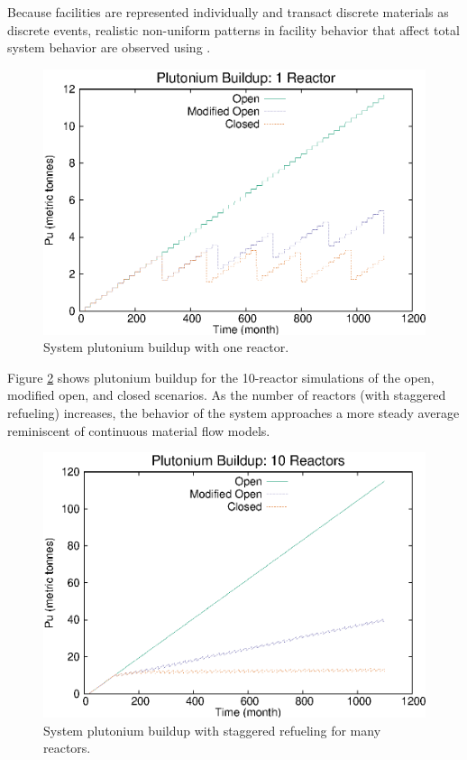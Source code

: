 Because facilities are represented individually and transact discrete
materials as discrete events, realistic non-uniform patterns in facility
behavior that affect total system behavior are observed using \Cyclus.

\begin{figure}[H]
\begin{center}
\includegraphics{./images/puseries-1.eps}
\end{center}
\caption{System plutonium buildup with one reactor.}
\label{fig:puseries1}
\end{figure}

Figure \ref{fig:puseriesn} shows plutonium buildup for the 10-reactor
simulations of the open, modified open, and closed scenarios.  As the number
of reactors (with staggered refueling) increases, the behavior of the system
approaches a more steady average reminiscent of continuous material flow
models.

\begin{figure}[H]
\begin{center}
\includegraphics{./images/puseries-n.eps}
\end{center}
\caption{System plutonium buildup with staggered refueling for many reactors.}
\label{fig:puseriesn}
\end{figure}

